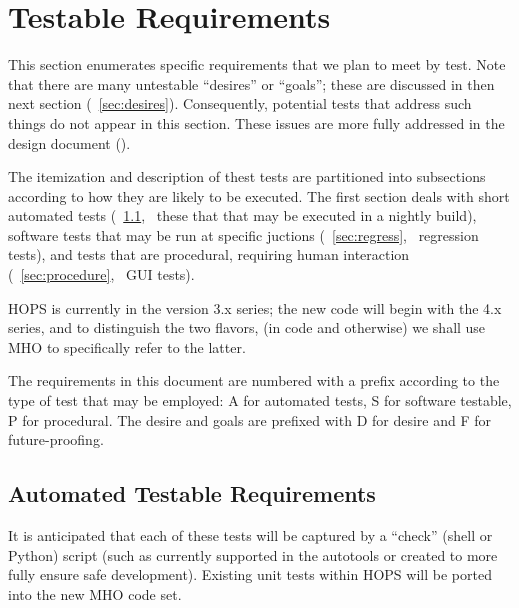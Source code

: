 %
%
\newcommand{\reqid}[1]{\item[\refstepcounter{req}#1-\thereq]}

\section{Testable Requirements}
\label{sec:testable}

This section enumerates specific requirements that we plan to meet by test.
Note that there are many untestable ``desires'' or ``goals''; these are
discussed in then next section (\Sec~\ref{sec:desires}).  Consequently,
potential tests that address such things do not appear in this section.
These issues are more fully addressed in the design document (\cite{design}).

The itemization and description of thest tests are partitioned into
subsections according to how they are likely to be executed.
The first section deals with short automated tests
(\Sec~\ref{sec:auto}, \ie~these that that may be executed
in a nightly build), software tests that may be run at specific
juctions (\Sec~\ref{sec:regress}, \ie~regression tests),
and tests that are procedural, requiring human interaction
(\Sec~\ref{sec:procedure}, \ie~\ac{GUI} tests).%

\ac{HOPS} is currently in the version 3.x series; the new code will
begin with the 4.x series, and to distinguish the two flavors, (in code
and otherwise) we shall use \ac{MHO} to specifically refer to the latter.

The requirements in this document are numbered with a prefix
according to the type of test that may be employed:
A for automated tests, S for software testable, P for procedural.
The desire and goals are prefixed with D for desire and
F for future-proofing.

\subsection{Automated Testable Requirements}
\label{sec:auto}

It is anticipated that each of these tests will be captured by a
``check'' (shell or Python) script (such as currently supported in
the autotools or created to more fully ensure safe development).
Existing unit tests within \ac{HOPS} will be ported into the
new \ac{MHO} code set.

